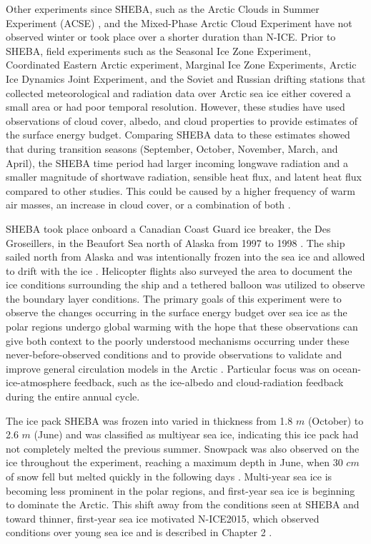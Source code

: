 Other experiments since SHEBA, such as the Arctic Clouds in Summer Experiment (ACSE) \citep{sotiropoulou:2016}, and the Mixed-Phase Arctic Cloud Experiment \citep{verlinde:2007} have not observed winter or took place over a shorter duration than N-ICE. Prior to SHEBA, field experiments such as the Seasonal Ice Zone Experiment, Coordinated Eastern Arctic experiment, Marginal Ice Zone Experiments, Arctic Ice Dynamics Joint Experiment, and the Soviet and Russian drifting stations \citep{vihma:2005, kahl:1999} that collected meteorological and radiation data over Arctic sea ice either covered a small area or had poor temporal resolution. However, these studies have used observations of cloud cover, albedo, and cloud properties to provide estimates of the surface energy budget. Comparing SHEBA data to these estimates showed that during transition seasons (September, October, November, March, and April), the SHEBA time period had larger incoming longwave radiation and a smaller magnitude of shortwave radiation, sensible heat flux, and latent heat flux compared to other studies. This could be caused by a higher frequency of warm air masses, an increase in cloud cover, or a combination of both \citep{persson:2002}. 

SHEBA took place onboard a Canadian Coast Guard ice breaker, the Des Groseillers, in the Beaufort Sea north of Alaska from 1997 to 1998 \citep{uttal:2002, shupe:2004}. The ship sailed north from Alaska and was intentionally frozen into the sea ice and allowed to drift with the ice \citep{uttal:2002}. Helicopter flights also surveyed the area to document the ice conditions surrounding the ship and a tethered balloon was utilized to observe the boundary layer conditions. The primary goals of this experiment were to observe the changes occurring in the surface energy budget over sea ice as the polar regions undergo global warming with the hope that these observations can give both context to the poorly understood mechanisms occurring under these never-before-observed conditions and to provide observations to validate and improve general circulation models in the Arctic \citep{uttal:2002}. Particular focus was on ocean-ice-atmosphere feedback, such as the ice-albedo and cloud-radiation feedback during the entire annual cycle. 

The ice pack SHEBA was frozen into varied in thickness from 1.8 $m$ (October) to 2.6 $m$ (June) and was classified as multiyear sea ice, indicating this ice pack had not completely melted the previous summer. Snowpack was also observed on the ice throughout the experiment, reaching a maximum depth in June, when 30 $cm$ of snow fell but melted quickly in the following days \citep{uttal:2002}. Multi-year sea ice is becoming less prominent in the polar regions, and first-year sea ice is beginning to dominate the Arctic. This shift away from the conditions seen at SHEBA and toward thinner, first-year sea ice motivated N-ICE2015, which observed conditions over young sea ice and is described in Chapter 2 \citep{graham:2017}. 

